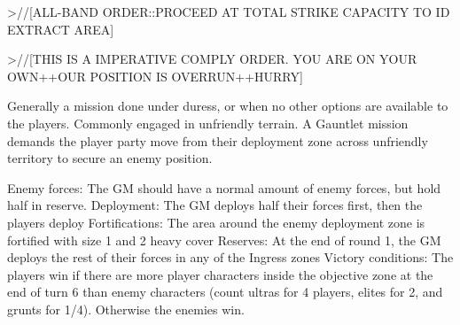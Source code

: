                                                              >//[ALL-BAND ORDER::PROCEED AT TOTAL
                                                             STRIKE CAPACITY TO ID EXTRACT AREA]

                                                             >//[THIS IS A IMPERATIVE COMPLY ORDER.
                                                             YOU ARE ON YOUR OWN++OUR POSITION
                                                             IS OVERRUN++HURRY]

                                                             Generally a mission done under duress, or
                                                            when no other options are available to the
                                                             players. Commonly engaged in unfriendly
                                                            terrain. A Gauntlet mission demands the
                                                             player party move from their deployment zone
                                                             across unfriendly territory to secure an enemy
                                                             position.

                                                             Enemy forces: The GM should have a
                                                             normal amount of enemy forces, but hold half
                                                             in reserve.
                                                             Deployment: The GM deploys half their
                                                            forces first, then the players deploy
                                                             Fortifications: The area around the enemy
                                                             deployment zone is fortified with size 1 and 2
                                                             heavy cover
                                                             Reserves: At the end of round 1, the GM
                                                             deploys the rest of their forces in any of the
                                                             Ingress zones
                                                            Victory conditions: The players win if there
                                                             are more player characters inside the
                                                             objective zone at the end of turn 6 than enemy
                                                            characters (count ultras for 4 players, elites for
2, and grunts for 1/4). Otherwise the enemies win.


